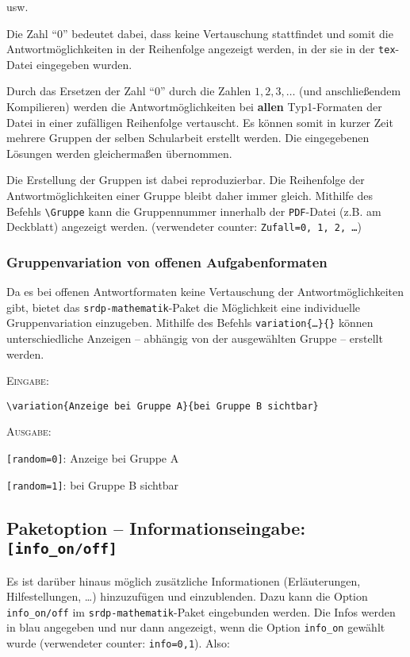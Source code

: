 \documentclass[a4paper,12pt]{article}
\begin{document}
usw.

Die Zahl "`0"' bedeutet dabei, dass keine Vertauschung stattfindet und somit die Antwortmöglichkeiten in der Reihenfolge angezeigt werden, in der sie in der \texttt{tex}-Datei eingegeben wurden. 

Durch das Ersetzen der Zahl "`0"' durch die Zahlen $1, 2, 3, \ldots$ (und anschließendem Kompilieren) werden die Antwortmöglichkeiten bei \textbf{allen} Typ1-Formaten der Datei in einer zufälligen Reihenfolge vertauscht. Es können somit in kurzer Zeit mehrere Gruppen der selben Schularbeit erstellt werden. Die eingegebenen Lösungen werden gleichermaßen übernommen. \leer

Die Erstellung der Gruppen ist dabei reproduzierbar. Die Reihenfolge der Antwortmöglichkeiten einer Gruppe bleibt daher immer gleich. Mithilfe des Befehls \texttt{\textbackslash Gruppe} kann die Gruppennummer innerhalb der \texttt{PDF}-Datei (z.B. am Deckblatt) angezeigt werden. (verwendeter counter: \texttt{Zufall=0, 1, 2, \ldots})


\subsubsection{Gruppenvariation von offenen Aufgabenformaten}
Da es bei offenen Antwortformaten keine Vertauschung der Antwortmöglichkeiten gibt, bietet das \texttt{srdp-mathematik}-Paket die Möglichkeit eine individuelle Gruppenvariation einzugeben. Mithilfe des Befehls \texttt{variation\{\ldots\}\{\}} können unterschiedliche Anzeigen -- abhängig von der ausgewählten Gruppe -- erstellt werden.

\textsc{Eingabe:}
\begin{verbatim}
\variation{Anzeige bei Gruppe A}{bei Gruppe B sichtbar}
\end{verbatim}

\textsc{Ausgabe:}

\texttt{[random=0]}: Anzeige bei Gruppe A

\texttt{[random=1]}: bei Gruppe B sichtbar





\subsection{Paketoption -- Informationseingabe: \texttt{[info\_on/off]}}
Es ist darüber hinaus möglich zusätzliche Informationen (Erläuterungen, Hilfestellungen, \ldots) hinzuzufügen und einzublenden. Dazu kann die Option \texttt{info\_on/off} im \texttt{srdp-mathematik}-Paket eingebunden werden. Die Infos werden in \textcolor[rgb]{0,0,1}{blau} angegeben und nur dann angezeigt, wenn die Option \texttt{info\_on} gewählt wurde (verwendeter counter: \texttt{info=0,1}). Also:
\end{document}
